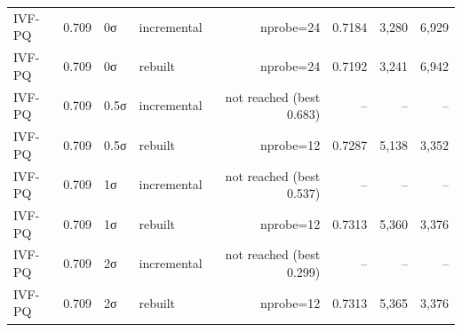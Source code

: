 \begin{table}[t]
\begin{tabular}{llllrrrr}
IVF-PQ & 0.709 & 0σ & incremental & nprobe=24 & 0.7184 & 3,280 & 6,929 \\
IVF-PQ & 0.709 & 0σ & rebuilt & nprobe=24 & 0.7192 & 3,241 & 6,942 \\
IVF-PQ & 0.709 & 0.5σ & incremental & not reached (best 0.683) & -- & -- & -- \\
IVF-PQ & 0.709 & 0.5σ & rebuilt & nprobe=12 & 0.7287 & 5,138 & 3,352 \\
IVF-PQ & 0.709 & 1σ & incremental & not reached (best 0.537) & -- & -- & -- \\
IVF-PQ & 0.709 & 1σ & rebuilt & nprobe=12 & 0.7313 & 5,360 & 3,376 \\
IVF-PQ & 0.709 & 2σ & incremental & not reached (best 0.299) & -- & -- & -- \\
IVF-PQ & 0.709 & 2σ & rebuilt & nprobe=12 & 0.7313 & 5,365 & 3,376 \\
\bottomrule
\end{tabular}
\end{table}
